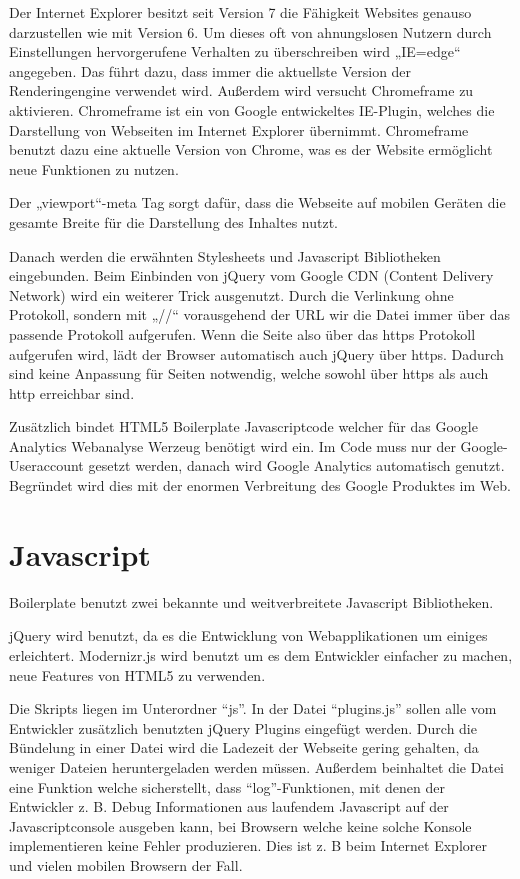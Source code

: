 \documentclass[12pt,journal,compsoc]{IEEEtran}
\begin{document}
Der Internet Explorer besitzt seit Version 7 die Fähigkeit Websites genauso darzustellen wie mit Version 6. 
Um dieses oft von ahnungslosen Nutzern durch Einstellungen hervorgerufene Verhalten zu überschreiben wird „IE=edge“ angegeben. Das führt dazu, dass immer die aktuellste Version der Renderingengine verwendet wird.
Außerdem wird versucht Chromeframe\cite{chrome} zu aktivieren.
Chromeframe ist ein von Google entwickeltes IE-Plugin, welches die Darstellung von Webseiten im Internet Explorer übernimmt. 
Chromeframe benutzt dazu eine aktuelle Version von Chrome, was es der Website ermöglicht neue Funktionen zu nutzen. 

Der „viewport“-meta Tag sorgt dafür, dass die Webseite auf mobilen Geräten die gesamte Breite für die Darstellung des Inhaltes nutzt.



Danach werden die erwähnten Stylesheets und Javascript Bibliotheken eingebunden. Beim Einbinden von jQuery vom Google CDN (Content Delivery Network) wird ein weiterer Trick ausgenutzt.
Durch die Verlinkung ohne Protokoll, sondern mit „//“ vorausgehend der URL wir die Datei immer über das passende Protokoll aufgerufen.
Wenn die Seite also über das  https Protokoll aufgerufen wird, lädt der Browser automatisch auch jQuery über https.
Dadurch sind keine Anpassung für Seiten notwendig, welche sowohl über https als auch http erreichbar sind. 

Zusätzlich bindet HTML5 Boilerplate Javascriptcode welcher für das Google Analytics Webanalyse Werzeug benötigt wird ein. Im Code muss nur der Google-Useraccount gesetzt werden, danach wird 
Google Analytics automatisch genutzt. Begründet wird dies mit der enormen Verbreitung des Google Produktes im Web.
\section{Javascript}

Boilerplate benutzt zwei bekannte und weitverbreitete Javascript Bibliotheken.

jQuery wird benutzt, da es die Entwicklung von Webapplikationen um einiges erleichtert.
Modernizr.js wird benutzt um es dem Entwickler einfacher zu machen, neue Features von HTML5 zu verwenden.

Die Skripts liegen im Unterordner “js”.
In der Datei “plugins.js” sollen alle vom Entwickler zusätzlich benutzten jQuery Plugins eingefügt werden. Durch die Bündelung in einer Datei wird die Ladezeit der Webseite gering gehalten,
da weniger Dateien heruntergeladen werden müssen. Außerdem beinhaltet die Datei eine Funktion welche sicherstellt,
dass “log”-Funktionen, mit denen der Entwickler z. B. Debug Informationen aus laufendem Javascript auf der Javascriptconsole ausgeben kann,
bei Browsern welche keine solche Konsole implementieren keine Fehler produzieren. Dies ist z. B beim Internet Explorer und vielen mobilen Browsern der Fall. 
\end{document}
